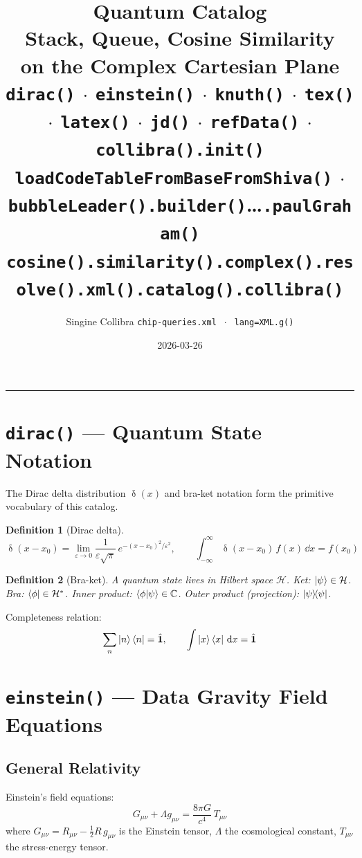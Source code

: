 \documentclass[12pt,a4paper]{article}
\title{%
  \textcolor{collibraBlue}{\Large Quantum Catalog}\\[0.4em]
  \large Stack, Queue, Cosine Similarity\\
  on the Complex Cartesian Plane\\[0.6em]
  \normalsize
  \texttt{dirac()} $\cdot$ \texttt{einstein()} $\cdot$ \texttt{knuth()} $\cdot$
  \texttt{tex()} $\cdot$ \texttt{latex()} $\cdot$ \texttt{jd()} $\cdot$
  \texttt{refData()} $\cdot$ \texttt{collibra().init()}\\[0.3em]
  \texttt{loadCodeTableFromBaseFromShiva()} $\cdot$
  \texttt{bubbleLeader().builder()}\ldots\texttt{.paulGraham()}\\[0.3em]
  \texttt{cosine().similarity().complex().resolve().xml().catalog().collibra()}
}
\author{Singine Collibra \texttt{chip-queries.xml} $\;\cdot\;$ \texttt{lang=XML.g()}}
\date{2026-03-26}
\newtheorem{defn}{Definition}
\DeclareMathOperator{\diracD}{\delta}
\begin{document}
\maketitle
\tableofcontents
\bigskip\hrule\bigskip

\section{\texttt{dirac()} — Quantum State Notation}

The Dirac delta distribution $\diracD(x)$ and bra-ket notation form the
primitive vocabulary of this catalog.

\begin{defn}[Dirac delta]
\[
  \diracD(x - x_0) = \lim_{\varepsilon \to 0}
    \frac{1}{\varepsilon\sqrt{\pi}}\, e^{-(x-x_0)^2/\varepsilon^2},
  \qquad
  \int_{-\infty}^{\infty} \diracD(x - x_0)\, f(x)\, \dd x = f(x_0)
\]
\end{defn}

\begin{defn}[Bra-ket]
A quantum state lives in Hilbert space $\mathcal{H}$.
Ket: $\ket{\psi} \in \mathcal{H}$.
Bra: $\bra{\phi} \in \mathcal{H}^*$.
Inner product: $\braket{\phi}{\psi} \in \mathbb{C}$.
Outer product (projection): $\ketbra{\psi}{\psi}$.
\end{defn}

Completeness relation:
\[
  \sum_n \ket{n}\bra{n} = \hat{\mathbf{1}}, \qquad
  \int \ket{x}\bra{x}\, \dd x = \hat{\mathbf{1}}
\]

\section{\texttt{einstein()} — Data Gravity Field Equations}

\subsection{General Relativity}

Einstein's field equations:
\[
  \boxed{G_{\mu\nu} + \Lambda g_{\mu\nu} = \frac{8\pi G}{c^4}\, T_{\mu\nu}}
\]
where $G_{\mu\nu} = R_{\mu\nu} - \tfrac{1}{2} R\, g_{\mu\nu}$ is the Einstein tensor,
$\Lambda$ the cosmological constant, $T_{\mu\nu}$ the stress-energy tensor.
\end{document}
